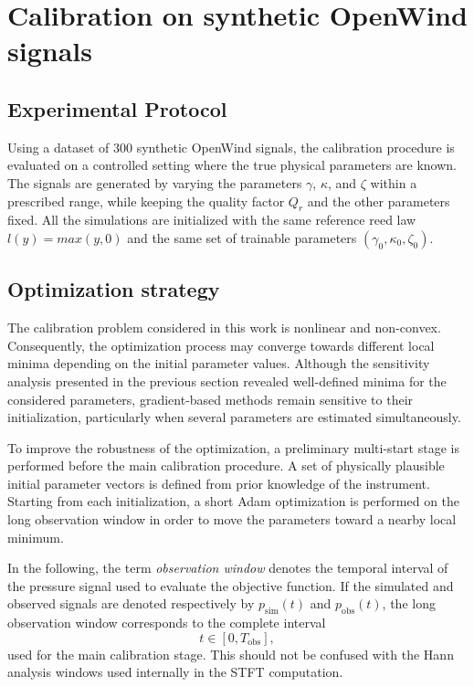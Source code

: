\documentclass[11pt,a4paper]{report}
\theoremstyle{plain}
\theoremstyle{definition}
\begin{document}
\section{Calibration on synthetic OpenWind signals}

\subsection{Experimental Protocol}
Using a dataset of 300 synthetic OpenWind signals, the calibration procedure is 
evaluated on a controlled setting where the true physical parameters are known. 
The signals are generated by varying the parameters \(\gamma\), \(\kappa\), and \(\zeta\)
within a prescribed range, while keeping the quality factor \(Q_r\) and the other 
parameters fixed.
All the simulations are initialized with the same reference reed law $l(y)=max(y,0)$ and 
the same set of trainable parameters $(\gamma_0,\kappa_0,\zeta_0)$.

\subsection{Optimization strategy}

The calibration problem considered in this work is nonlinear and non-convex.
Consequently, the optimization process may converge towards different local
minima depending on the initial parameter values. Although the sensitivity
analysis presented in the previous section revealed well-defined minima for the
considered parameters, gradient-based methods remain sensitive to their
initialization, particularly when several parameters are estimated
simultaneously.

To improve the robustness of the optimization, a preliminary multi-start stage
is performed before the main calibration procedure. A set of physically
plausible initial parameter vectors is defined from prior knowledge of the
instrument. Starting from each initialization, a short Adam optimization is
performed on the long observation window in order to move the parameters toward
a nearby local minimum.

In the following, the term \emph{observation window} denotes the temporal
interval of the pressure signal used to evaluate the objective function.
If the simulated and observed signals are denoted respectively by
$p_{\mathrm{sim}}(t)$ and $p_{\mathrm{obs}}(t)$, the long observation window
corresponds to the complete interval
\[
t\in[0,T_{\mathrm{obs}}],
\]
used for the main calibration stage. This should not be confused with the
Hann analysis windows used internally in the STFT computation.
\end{document}
